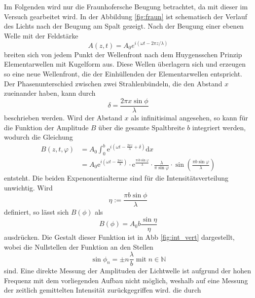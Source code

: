 Im Folgenden wird nur die Fraunhofersche Beugung betrachtet, da mit dieser im Versuch gearbeitet wird. 
In der Abbildung \ref{fig:fraun} ist schematisch der Verlauf des Lichts nach der Beugung am Spalt gezeigt. Nach der Beugung einer 
ebenen Welle mit der Feldstärke
\begin{equation}
    A(z,t) = A_0 e^{i(\omega t - 2\pi z / \lambda)} 
\end{equation}
breiten sich von jedem Punkt der Wellenfront nach dem Huygensschen Prinzip Elementarwellen mit Kugelform aus. Diese Wellen 
überlagern sich und erzeugen so eine neue Wellenfront, die der Einhüllenden der Elementarwellen entspricht. Der Phasenunterschied
zwischen zwei Strahlenbündeln, die den Abstand $x$ zueinander haben, kann durch 
\begin{equation}
    \delta = \frac{2\pi x \sin \phi}{\lambda}
\end{equation}
beschrieben werden. Wird der Abstand $x$  als infinitisimal angesehen, so kann für die Funktion der Amplitude $B$ über die gesamte
Spaltbreite $b$  integriert werden, wodurch die Gleichung 
\begin{align}
    B(z,t,\varphi) &= A_0 \int_0^b \mathrm{e}^{i(\omega t - \frac{2 \pi z}{\lambda} + \delta)} \mathrm{d}x \\
    &= A_0 \mathrm{e}^{i \left (\omega t - \frac{2 \pi z}{\lambda} \right )} \cdot \mathrm{e}^{\frac{\pi i b \sin \varphi}{\lambda}} \cdot \frac{\lambda}{\pi \sin \varphi} \cdot \sin \left (\frac{\pi b \sin \varphi}{\lambda} \right )
   \label{eqn:amp}
\end{align}
entsteht. 
Die beiden Expenonentialterme sind für die Intensitätsverteilung unwichtig. Wird 
\begin{equation}
    \eta := \frac{\pi b \sin\phi}{\lambda}
\end{equation}
definiert, so lässt sich $B(\phi)$ als 
\begin{equation}
    B(\phi) = A_0 b \frac{\sin\eta}{\eta}
    \label{eqn:amp_ez}
\end{equation}
ausdrücken. Die Gestalt dieser Funktion ist in Abb \ref{fig:int_vert} dargestellt, wobei die Nullstellen der Funktion an den Stellen
\begin{equation}
    \sin \phi_n = \pm n\frac{\lambda}{b}\;\text{mit}\; n\in \mathds{N}
\end{equation} 
sind. Eine direkte Messung der Amplituden der Lichtwelle ist aufgrund der hohen Frequenz mit dem vorliegenden Aufbau nicht möglich,
weshalb auf eine Messung der zeitlich gemittelten Intensität zurückgegriffen wird. die durch 
